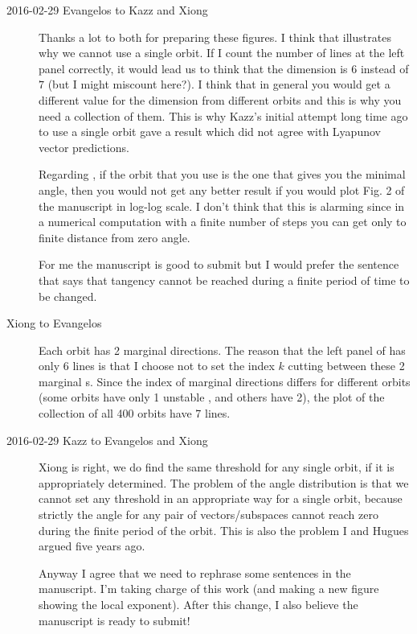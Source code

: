 \begin{description}

\item[2016-02-29 Evangelos to Kazz and Xiong] Thanks a lot to both for preparing these figures.
I think that  illustrates why we cannot use a single orbit.
If I count the number of lines at the left panel correctly, it would lead us to think that
the dimension is $6$ instead of $7$ (but I might miscount here?). I think that in general
you would get a different value for the dimension from different orbits and this is why
you need a collection of them. This is why Kazz's initial attempt long time ago to use
a single orbit gave a result which did not agree with Lyapunov vector predictions.

Regarding , if the orbit that you use is the one that gives you the minimal
angle, then you would not get any better result if you would plot Fig. 2 of the manuscript
in log-log scale. I don't think that this is alarming since in a numerical computation with
a finite number of steps you can get only to finite distance from zero angle.

For me the manuscript is good to submit but I would prefer the sentence that
says that tangency cannot be reached during a finite period of time to be changed.

\item[Xiong to Evangelos]
Each orbit has 2 marginal directions.
The reason that the left panel of  has
only 6 lines is that I choose not to set the index $k$ cutting
between these
2 marginal \Fv s. Since the index of marginal directions differs
for different orbits (some orbits have only 1 unstable \Fv, and
others have 2), the plot of the collection of all 400 orbits have 7
lines.

\item[2016-02-29 Kazz to Evangelos and Xiong]
Xiong is right, we do find the same threshold for any single orbit, if it is appropriately determined. The problem of the angle distribution is that we cannot set any threshold in an appropriate way for a single orbit, because strictly the angle for any pair of vectors/subspaces cannot reach zero during the finite period of the orbit. This is also the problem I and Hugues argued five years ago.

Anyway I agree that we need to rephrase some sentences in the manuscript. I'm taking charge of this work (and making a new figure showing the local exponent). After this change, I also believe the manuscript is ready to submit!


\end{description}
